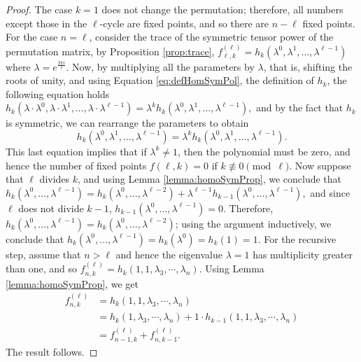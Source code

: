 \documentclass[12pt]{amsart}
\newcommand{\sebas}[1]{{\color{blue} \sf  #1}}
\begin{document}
    \begin{proof}
        The case $k=1$ does not change the permutation; therefore, all numbers except those in the $\ell$-cycle are fixed points, and so there are $n-\ell$ fixed points.
        For the case $n=\ell$, consider the trace of the symmetric tensor power of the permutation matrix, by Proposition \ref{prop:trace}, $f ^{(\ell)}_{\ell,k} = h_k(\lambda^0, \lambda^1, \dots, \lambda^{\ell-1})$ where $\lambda = e^{\frac{2\pi i}{\ell}}$. Now, by multiplying all the parameters by $\lambda$, that is, shifting the roots of unity, and using Equation \ref{eq:defHomSymPol}, the definition of $h_k$, the following equation holds $h_k(\lambda \cdot \lambda^0, \lambda \cdot \lambda^1, \dots, \lambda \cdot \lambda^{\ell -1}) = \lambda^{k} h_k(\lambda^0, \lambda^1, \dots, \lambda^{\ell-1}),$
        and by the fact that $h_k$ is symmetric, we can rearrange the parameters to obtain
        $$h_k(\lambda^0, \lambda^1, \dots, \lambda^{\ell -1}) = \lambda^{k} h_k(\lambda^0, \lambda^1, \dots, \lambda^{\ell -1}).$$
        This last equation implies that if $\lambda ^k \neq 1$, then the polynomial must be zero, and hence the number of fixed points $f(\ell,k)=0$ if $k \not \equiv 0 \pmod \ell$. Now suppose that $\ell$ divides $k$, and using Lemma \ref{lemma:homoSymProp}, we conclude that $h_k(\lambda^0, \dots, \lambda^{\ell-1}) = h_k(\lambda^0, \dots, \lambda^{\ell-2}) + \lambda^{\ell -1} h_{k-1}(\lambda^0, \dots, \lambda^{\ell-1}),$
        and since $\ell$ does not divide $k-1$,  $h_{k-1}(\lambda^0, \dots, \lambda^{\ell-1}) = 0$. Therefore, $h_k(\lambda^0, \dots, \lambda^{\ell-1}) = h_k(\lambda^0, \dots, \lambda^{\ell-2})$; using the argument inductively, we conclude that $h_k(\lambda^0, \dots, \lambda^{\ell-1}) = h_k(\lambda^0) = h_k(1) = 1$. For the recursive step, assume that $n>\ell$ and hence the eigenvalue $\lambda = 1$ has multiplicity greater than one, and so $f ^{(\ell)}_{n,k} = h_k(1,1,\lambda _3,\cdots ,\lambda _n)$. Using Lemma \ref{lemma:homoSymProp}, we get 
        \begin{align*}
            f ^{(\ell)}_{n,k} &=   h_k(1,1,\lambda _3,\cdots ,\lambda _n)\\
            &=h_k(1,\lambda _3,\cdots ,\lambda _n)+1\cdot h_{k-1}(1,1,\lambda _3,\cdots ,\lambda _n)\\
            &=f ^{(\ell)}_{n-1,k}+f ^{(\ell)}_{n,k-1}.
        \end{align*}
        The result follows.
    \end{proof}
\end{document}
